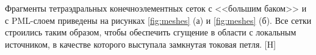 \documentclass[a4paper,14pt]{article}
\makeatletter
\renewenvironment{figure}[1][\fps@figure]{
  \edef\@tempa{\noexpand\@float{figure}[#1]}
  \@tempa
  \addtocounter{foofigure}{1}
}{
  \end@float
}
\makeatother
\begin{document}
Фрагменты тетраэдральных конечноэлементных сеток с <<большим баком>> и с PML-слоем приведены на рисунках \ref{fig:meshes} (а) и \ref{fig:meshes} (б). Все сетки строились таким образом,
чтобы обеспечить сгущение в области с локальным источником, в качестве которого выступала замкнутая токовая петля.
\begin{figure}[H]
	\centering
	\caption{конечноэлементные сетки: (а) <<большой бак>> и (б) PML-слой}
	\label{fig:meshes}
\end{figure}
\end{document}
